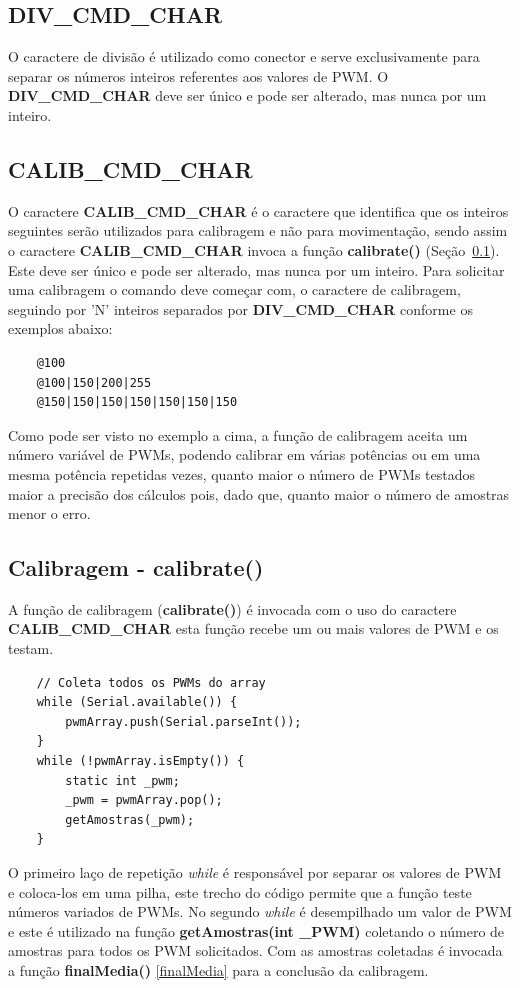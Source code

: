 \documentclass[a4paper,12pt,portuguese]{ufms-cpcx}
\begin{document}
\subsection*{{DIV\_CMD\_CHAR}}\label{divcmd}
O caractere de divisão é utilizado como conector e serve exclusivamente para separar os números inteiros referentes aos valores de PWM. O \textbf{DIV\_CMD\_CHAR} deve ser único e pode ser alterado, mas nunca por um inteiro.

\subsection*{CALIB\_CMD\_CHAR}\label{calibcmd}
O caractere \textbf{CALIB\_CMD\_CHAR} é o caractere que identifica que os inteiros seguintes serão utilizados para calibragem e não para movimentação, sendo assim o caractere \textbf{CALIB\_CMD\_CHAR} invoca a função \textbf{calibrate()} (Seção~\ref{calibrate}). Este deve ser único e pode ser alterado, mas nunca por um inteiro.
Para solicitar uma calibragem o comando deve começar com, o caractere de calibragem, seguindo por 'N' inteiros separados por \textbf{DIV\_CMD\_CHAR} conforme os exemplos abaixo:
\begin{lstlisting}
	@100
	@100|150|200|255
	@150|150|150|150|150|150|150
\end{lstlisting}
Como pode ser visto no exemplo a cima, a função de calibragem aceita um número variável de PWMs, podendo calibrar em várias potências ou em uma mesma potência repetidas vezes, quanto maior o número de PWMs testados maior a precisão dos cálculos pois, dado que, quanto maior o número de amostras menor o erro.

\subsection{Calibragem - calibrate()}\label{calibrate}
A função de calibragem (\textbf{calibrate()}) é invocada com o uso do caractere \textbf{CALIB\-\_CMD\_CHAR} esta função recebe um ou mais valores de PWM e os testam.
\begin{lstlisting}
	// Coleta todos os PWMs do array
	while (Serial.available()) {
		pwmArray.push(Serial.parseInt());
	}
	while (!pwmArray.isEmpty()) {
		static int _pwm;
		_pwm = pwmArray.pop();
		getAmostras(_pwm);
	}
\end{lstlisting}

O primeiro laço de repetição \textit{while} é responsável por separar os valores de PWM e coloca-los em uma pilha, este trecho do código permite que a função teste números variados de PWMs.
No segundo \textit{while} é desempilhado um valor de PWM e este é utilizado na função \textbf{getAmostras(int \_PWM)} coletando o número de amostras para todos os PWM solicitados. Com as amostras coletadas é invocada a função \textbf{finalMedia()} \ref{finalMedia} para a conclusão da calibragem.
\end{document}
